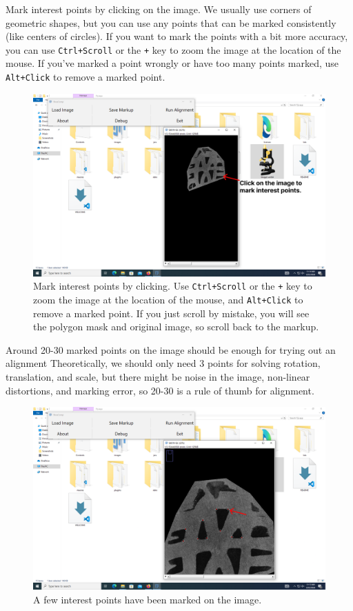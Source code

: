 \documentclass{csafedoc}
\begin{document}
Mark interest points by clicking on the image. We usually use corners of geometric shapes,
but you can use any points that can be marked consistently (like centers of circles). If
you want to mark the points with a bit more accuracy, you can use \texttt{Ctrl+Scroll} or
the \texttt{+} key to zoom the image at the location of the mouse. If you've marked a
point wrongly or have too many points marked, use \texttt{Alt+Click} to remove a marked
point.

\begin{figure}[H]
	\begin{center}
		\includegraphics[width=0.8\linewidth]{images/step_4d-anno.png}
	\end{center}
	\caption{Mark interest points by clicking. Use \texttt{Ctrl+Scroll} or the \texttt{+} key
		to zoom the image at the location of the mouse, and \texttt{Alt+Click} to remove a marked
		point. If you just scroll by mistake, you will see the polygon mask and original image, so
		scroll back to the markup.}
	\label{fig:step4d}
\end{figure}

Around 20-30 marked points on the image should be enough for trying out an alignment
Theoretically, we should only need 3 points for solving rotation, translation, and scale,
but there might be noise in the image, non-linear distortions, and marking error, so 20-30
is a rule of thumb for alignment.

\begin{figure}[H]
	\begin{center}
		\includegraphics[width=0.8\linewidth]{images/step_4e-anno.png}
	\end{center}
	\caption{A few interest points have been marked on the image.}
	\label{fig:step4e}
\end{figure}
\end{document}
